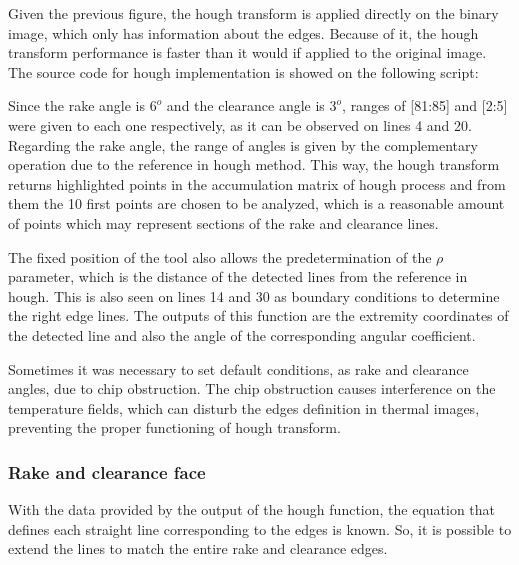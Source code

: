 			Given the previous figure, the hough transform is applied directly on the binary image, which only has information about the edges. Because of it, the hough transform performance is faster than it would if applied to the original image. The source code for hough implementation is showed on the following script:

			

			Since the rake angle is $6^{o}$ and the clearance angle is $3^{o}$, ranges of [81:85] and [2:5] were given to each one respectively, as it can be observed on lines 4 and 20. Regarding the rake angle, the range of angles is given by the complementary operation due to the reference in hough method. This way, the hough transform returns highlighted points in the accumulation matrix of hough process and from them the 10 first points are chosen to be analyzed, which is a reasonable amount of points which may represent sections of the rake and clearance lines.

			The fixed position of the tool also allows the predetermination of the $\rho$ parameter, which is the distance of the detected lines from the reference in hough. This is also seen on lines 14 and 30 as boundary conditions to determine the right edge lines. The outputs of this function are the extremity coordinates of the detected line and also the angle of the corresponding angular coefficient. 

			Sometimes it was necessary to set default conditions, as rake and clearance angles, due to chip obstruction. The chip obstruction causes interference on the temperature fields, which can disturb the edges definition in thermal images, preventing the proper functioning of hough transform.

		\subsubsection{Rake and clearance face}

			With the data provided by the output of the hough function, the equation that defines each straight line corresponding to the edges is known. So, it is possible to extend the lines to match the entire rake and clearance edges.

